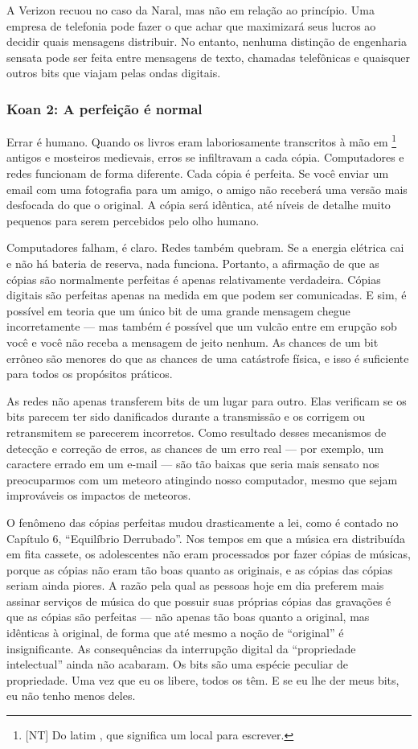 A Verizon recuou no caso da Naral, mas não em relação ao princípio. Uma empresa 
de telefonia pode fazer o que achar que maximizará seus lucros ao decidir quais 
mensagens distribuir. No entanto, nenhuma distinção de engenharia sensata pode 
ser feita entre mensagens de texto, chamadas telefônicas e quaisquer outros bits
que viajam pelas ondas digitais.


\subsubsection*{Koan 2: A perfeição é normal}
Errar é humano. Quando os livros eram laboriosamente transcritos à mão em 
\footnote{[NT] Do latim , que significa
um local para escrever.} antigos e mosteiros medievais, erros se infiltravam a
cada cópia. Computadores e redes funcionam de forma diferente. Cada cópia é
perfeita. Se você enviar um email com uma fotografia para um amigo, o amigo não
receberá uma versão mais desfocada do que o original. A cópia será idêntica, até
níveis de detalhe muito pequenos para serem percebidos pelo olho humano.

Computadores falham, é claro. Redes também quebram. Se a energia elétrica cai e
não há bateria de reserva, nada funciona. Portanto, a afirmação de que as cópias
são normalmente perfeitas é apenas relativamente verdadeira. Cópias digitais são
perfeitas apenas na medida em que podem ser comunicadas. E sim, é possível em
teoria que um único bit de uma grande mensagem chegue incorretamente --- mas
também é possível que um vulcão entre em erupção sob você e você não receba a
mensagem de jeito nenhum. As chances de um bit errôneo são menores do que as
chances de uma catástrofe física, e isso é suficiente para todos os propósitos
práticos.

As redes não apenas transferem bits de um lugar para outro. Elas verificam se os
bits parecem ter sido danificados durante a transmissão e os corrigem ou 
retransmitem se parecerem incorretos. Como resultado desses mecanismos de 
detecção e correção de erros, as chances de um erro real --- por exemplo, um
caractere errado em um e-mail --- são tão baixas que seria mais sensato nos
preocuparmos com um meteoro atingindo nosso computador, mesmo que sejam
improváveis os impactos de meteoros.

O fenômeno das cópias perfeitas mudou drasticamente a lei, como é contado no
Capítulo 6, ``Equilíbrio Derrubado''. Nos tempos em que a música era distribuída
em fita cassete, os adolescentes não eram processados por fazer cópias de 
músicas, porque as cópias não eram tão boas quanto as originais, e as cópias das
cópias seriam ainda piores. A razão pela qual as pessoas hoje em dia preferem
mais assinar serviços de música do que possuir suas próprias cópias das
gravações é que as cópias são perfeitas --- não apenas tão boas quanto a
original, mas idênticas à original, de forma que até mesmo a noção de
``original'' é insignificante. As consequências da interrupção digital da
``propriedade intelectual'' ainda não acabaram. Os bits são uma espécie peculiar
de propriedade. Uma vez que eu os libere, todos os têm. E se eu lhe der meus
bits, eu não tenho menos deles.



